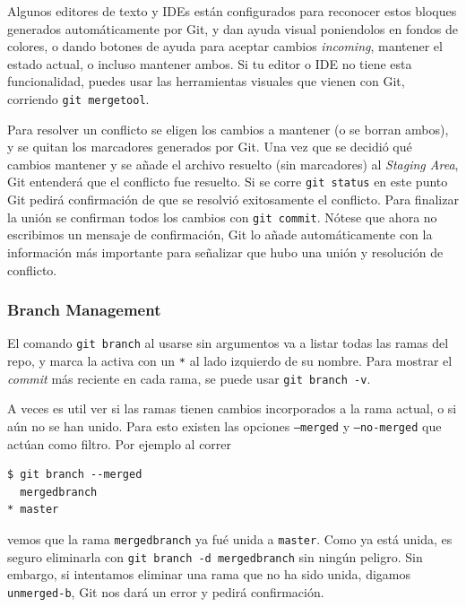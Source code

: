 \documentclass[spanish, 12pt, a4paper]{article}
\begin{document}
Algunos editores de texto y IDEs están configurados para reconocer estos
bloques generados automáticamente por Git, y dan ayuda visual
poniendolos en fondos de colores, o dando botones de ayuda para aceptar
cambios \emph{incoming}, mantener el estado actual, o incluso mantener
ambos. Si tu editor o IDE no tiene esta funcionalidad, puedes usar las
herramientas visuales que vienen con Git, corriendo
\passthrough{\lstinline!git mergetool!}.

Para resolver un conflicto se eligen los cambios a mantener (o se borran
ambos), y se quitan los marcadores generados por Git. Una vez que se
decidió qué cambios mantener y se añade el archivo resuelto (sin
marcadores) al \emph{Staging Area}, Git entenderá que el conflicto fue
resuelto. Si se corre \passthrough{\lstinline!git status!} en este punto
Git pedirá confirmación de que se resolvió exitosamente el conflicto.
Para finalizar la unión se confirman todos los cambios con
\passthrough{\lstinline!git commit!}. Nótese que ahora no escribimos un
mensaje de confirmación, Git lo añade automáticamente con la información
más importante para señalizar que hubo una unión y resolución de
conflicto.

\subsubsection{Branch Management}

El comando \passthrough{\lstinline!git branch!} al usarse sin argumentos
va a listar todas las ramas del repo, y marca la activa con un
\passthrough{\lstinline!*!} al lado izquierdo de su nombre. Para mostrar
el \emph{commit} más reciente en cada rama, se puede usar
\passthrough{\lstinline!git branch -v!}.

A veces es util ver si las ramas tienen cambios incorporados a la rama
actual, o si aún no se han unido. Para esto existen las opciones
\passthrough{\lstinline!–merged!} y \passthrough{\lstinline!–no-merged!}
que actúan como filtro. Por ejemplo al correr

\begin{lstlisting}
$ git branch --merged
  mergedbranch
* master
\end{lstlisting}

vemos que la rama \passthrough{\lstinline!mergedbranch!} ya fué unida a
\passthrough{\lstinline!master!}. Como ya está unida, es seguro
eliminarla con \passthrough{\lstinline!git branch -d mergedbranch!} sin
ningún peligro. Sin embargo, si intentamos eliminar una rama que no ha
sido unida, digamos \passthrough{\lstinline!unmerged-b!}, Git nos dará
un error y pedirá confirmación.
\end{document}
